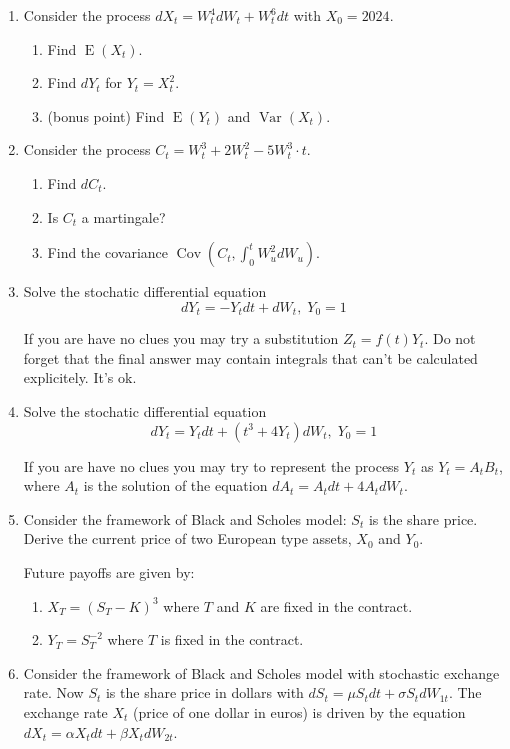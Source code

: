 \documentclass[12pt]{article}
\DeclareMathOperator{\Cov}{Cov}
\DeclareMathOperator{\Var}{Var}
\DeclareMathOperator{\E}{E}
\begin{document}
\begin{enumerate}

\item Consider the process $dX_t = W_t^4 dW_t + W_t^6 dt$ with $X_0 = 2024$.
\begin{enumerate}
  \item Find $\E(X_t)$.
  \item Find $dY_t$ for $Y_t = X_t^2$.
  \item (bonus point) Find $\E(Y_t)$ and $\Var(X_t)$.
\end{enumerate}

\item Consider the process $C_t = W_t^3 + 2W_t^2 - 5 W_t^3 \cdot t$.
\begin{enumerate}
  \item Find $dC_t$. 
  \item Is $C_t$ a martingale?
  \item Find the covariance $\Cov\left(C_t, \int_0^t W^2_u dW_u\right)$.
\end{enumerate}

\item Solve the stochatic differential equation
\[
dY_t = - Y_t dt + dW_t, \; Y_0 = 1
\]

If you are have no clues you may try a substitution $Z_t = f(t) Y_t$. 
Do not forget that the final answer may contain integrals that can't be calculated explicitely. It's ok.

\item Solve the stochatic differential equation
\[
dY_t = Y_t dt + (t^3 + 4Y_t) dW_t, \; Y_0 = 1
\]

If you are have no clues you may try to represent the process $Y_t$ as $Y_t = A_t B_t$, 
where $A_t$ is the solution of the equation $dA_t = A_t dt + 4A_t dW_t$. 

\item Consider the framework of Black and Scholes model: $S_t$ is the share price. 
Derive the current price of two European type assets, $X_0$ and $Y_0$. 

Future payoffs are given by:
\begin{enumerate}
  \item $X_T = (S_T - K)^3$ where $T$ and $K$ are fixed in the contract.
  \item $Y_T = S_T^{-2}$ where $T$ is fixed in the contract. 
\end{enumerate}

\item Consider the framework of Black and Scholes model with stochastic exchange rate. 
Now $S_t$ is the share price in dollars with $dS_t = \mu S_t dt + \sigma S_t dW_{1t}$.
The exchange rate $X_t$ (price of one dollar in euros) is driven by the equation 
$dX_t = \alpha X_t dt + \beta X_t dW_{2t}$. 


\end{enumerate}
\end{document}

